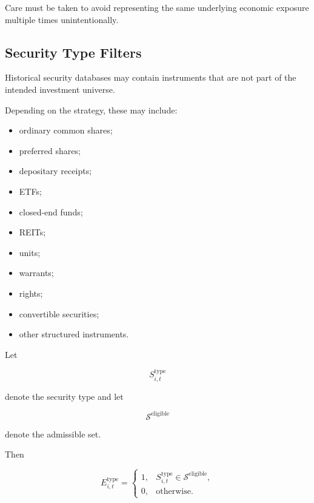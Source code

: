 \documentclass[11pt,a4paper]{article}
\begin{document}
Care must be taken to avoid representing the same underlying economic exposure
multiple times unintentionally.


\subsection{Security Type Filters}
\label{subsec:security_type_filters}

Historical security databases may contain instruments that are not part of the
intended investment universe.

Depending on the strategy, these may include:

\begin{itemize}
    \item ordinary common shares;
    \item preferred shares;
    \item depositary receipts;
    \item ETFs;
    \item closed-end funds;
    \item REITs;
    \item units;
    \item warrants;
    \item rights;
    \item convertible securities;
    \item other structured instruments.
\end{itemize}

Let

\begin{equation}
S_{i,t}^{\mathrm{type}}
\end{equation}

denote the security type and let

\begin{equation}
\mathcal{S}^{\mathrm{eligible}}
\end{equation}

denote the admissible set.

Then

\begin{equation}
E_{i,t}^{\mathrm{type}}
=
\begin{cases}
1,
&
S_{i,t}^{\mathrm{type}}
\in
\mathcal{S}^{\mathrm{eligible}},
\\
0,
&
\text{otherwise}.
\end{cases}
\end{equation}
\end{document}
